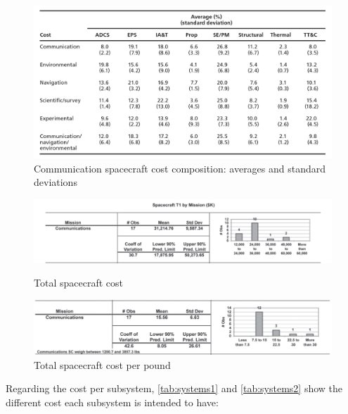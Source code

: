 \documentclass[11pt,a4paper,titlepage]{article}
\begin{document}
		\begin{figure}
			\centering
			\includegraphics[width = 1\textwidth]{Standard_dev.png}
			\caption{Communication spacecraft cost composition: averages and standard deviations}
			\label{fig:distribution}
		\end{figure}
		
		\begin{figure}
			\centering
			\begin{minipage}{1\textwidth}
			\centering
			\includegraphics[width = .95\textwidth]{mission.png}
			\caption{Total spacecraft cost}
			\label{fig:mission}
			\end{minipage}
			\hspace{20mm}
			\begin{minipage}{.95\textwidth}
			\centering
			\includegraphics[width = .95\textwidth]{mission_pound.png}
			\caption{Total spacecraft cost per pound}
			\label{fig:mission_pound}
			\end{minipage}
		\end{figure}
		
		Regarding the cost per subsystem, \autoref{tab:systems1} and \autoref{tab:systems2} show the different cost each 				subsystem is intended to have:
		
\end{document}
